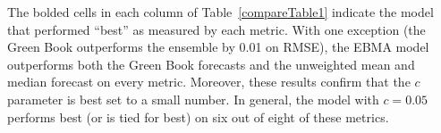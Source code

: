 \documentclass[12pt,fullpage,endnotes]{article}
\begin{document}
The bolded cells in each column of Table~\ref{compareTable1} indicate
the model that performed ``best'' as measured by each metric.  With
one exception (the Green Book outperforms the ensemble by 0.01 on
RMSE), the EBMA model outperforms both the Green Book forecasts and the
unweighted mean and median forecast on every metric.  Moreover, these
results confirm that the $c$ parameter is best set to a small number.
In general, the model with $c=0.05$ performs best (or is tied for
best) on six out of eight of these metrics.








%
%
%
\end{document}
